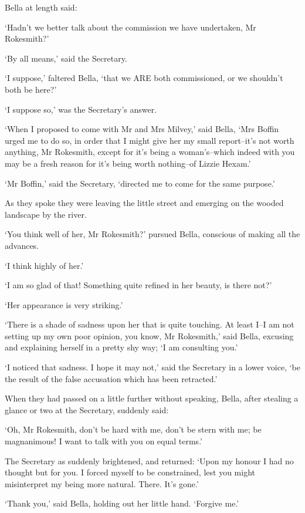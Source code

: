 Bella at length said:

‘Hadn’t we better talk about the commission we have undertaken, Mr
Rokesmith?’

‘By all means,’ said the Secretary.

‘I suppose,’ faltered Bella, ‘that we ARE both commissioned, or we
shouldn’t both be here?’

‘I suppose so,’ was the Secretary’s answer.

‘When I proposed to come with Mr and Mrs Milvey,’ said Bella, ‘Mrs
Boffin urged me to do so, in order that I might give her my small
report--it’s not worth anything, Mr Rokesmith, except for it’s being
a woman’s--which indeed with you may be a fresh reason for it’s being
worth nothing--of Lizzie Hexam.’

‘Mr Boffin,’ said the Secretary, ‘directed me to come for the same
purpose.’

As they spoke they were leaving the little street and emerging on the
wooded landscape by the river.

‘You think well of her, Mr Rokesmith?’ pursued Bella, conscious of
making all the advances.

‘I think highly of her.’

‘I am so glad of that! Something quite refined in her beauty, is there
not?’

‘Her appearance is very striking.’

‘There is a shade of sadness upon her that is quite touching. At least
I--I am not setting up my own poor opinion, you know, Mr Rokesmith,’
said Bella, excusing and explaining herself in a pretty shy way; ‘I am
consulting you.’

‘I noticed that sadness. I hope it may not,’ said the Secretary in
a lower voice, ‘be the result of the false accusation which has been
retracted.’

When they had passed on a little further without speaking, Bella, after
stealing a glance or two at the Secretary, suddenly said:

‘Oh, Mr Rokesmith, don’t be hard with me, don’t be stern with me; be
magnanimous! I want to talk with you on equal terms.’

The Secretary as suddenly brightened, and returned: ‘Upon my honour I
had no thought but for you. I forced myself to be constrained, lest you
might misinterpret my being more natural. There. It’s gone.’

‘Thank you,’ said Bella, holding out her little hand. ‘Forgive me.’


